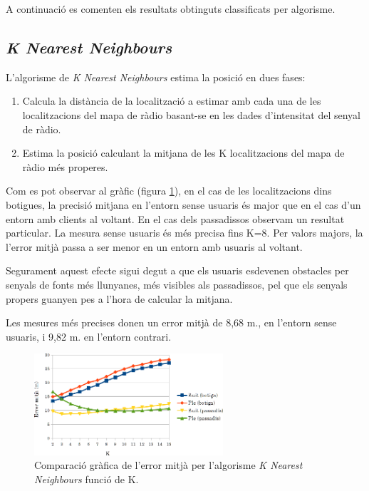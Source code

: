 A continuació es comenten els resultats obtinguts classificats per algorisme.

\subsection{\textit{K Nearest Neighbours}}

L'algorisme de \textit{K Nearest Neighbours} estima la posició en dues fases:

\begin{enumerate}
    \item Calcula la distància de la localització a estimar amb cada una de les localitzacions del mapa de ràdio basant-se en les dades d'intensitat del senyal de ràdio.
    \item Estima la posició calculant la mitjana de les K localitzacions del mapa de ràdio més properes.
\end{enumerate}

Com es pot observar al gràfic (figura \ref{fig:grafic_mitja_KNN}), en el cas de les localitzacions dins botigues, la precisió mitjana en l'entorn sense usuaris és major que en el cas d'un entorn amb clients al voltant. En el cas dels passadissos observam un resultat particular. La mesura sense usuaris és més precisa fins K=8. Per valors majors, la l'error mitjà passa a ser menor en un entorn amb usuaris al voltant.

Segurament aquest efecte sigui degut a que els usuaris esdevenen obstacles per senyals de fonts més llunyanes, més visibles als passadissos, pel que els senyals propers guanyen pes a l'hora de calcular la mitjana.

Les mesures més precises donen un error mitjà de 8,68 m., en l'entorn sense usuaris, i 9,82 m. en l'entorn contrari.

\begin{figure}[ht]
\begin{center}
\includegraphics[width=7cm]{imatges/knn_mitja.png}
\caption{Comparació gràfica de l'error mitjà per l'algorisme \textit{K Nearest Neighbours} funció de K.}
\label{fig:grafic_mitja_KNN}
\end{center}
\end{figure}

